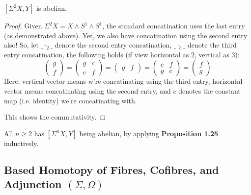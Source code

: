 \documentclass{article}
\begin{document}
\begin{prop}
    $[\Sigma^2 X,Y]$ is abelian.
\end{prop}
\begin{proof}
    Given $\Sigma^2 X = X\wedge S^1\wedge S^1$, the standard concatination uses the last entry (as demonstrated above). Yet, we also have concatination using the second entry also! So, let $\_\cdot_2\_$ denote the second entry concatination, $\_\cdot_3\_$ denote the third entry concatination, the following holds (if view horizontal as $2$, vertical as $3$):
    \[\begin{pmatrix}
        g\\f
    \end{pmatrix} = \begin{pmatrix}
        g & c\\
        c & f
    \end{pmatrix} = \begin{pmatrix}
        g & f
    \end{pmatrix} = \begin{pmatrix}
         c & f\\
         g & c
    \end{pmatrix} = \begin{pmatrix}
        f\\g
    \end{pmatrix}\]
    Here,  vertical vector means w're concatinating using the third entry, horizontal vector means concatinating using the second entry, and $c$ denotes the constant map (i.e. identity) we're concatinating with. 

    This shows the commutativity.
\end{proof}
\begin{cor}
    All $n\geq 2$ has $[\Sigma^n X,Y]$ being abelian, by applying \textbf{Proposition 1.25} inductively.
\end{cor}

\newpage

\subsection{Based Homotopy of Fibres, Cofibres, and Adjunction $(\Sigma, \Omega)$}
\end{document}
